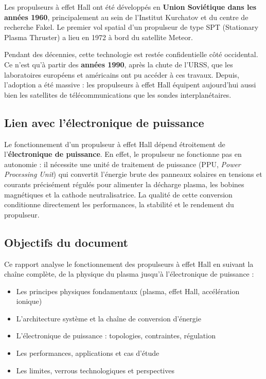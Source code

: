 \documentclass[12pt,a4paper]{article}
\begin{document}
Les propulseurs à effet Hall ont été développés en \textbf{Union Soviétique dans les années 1960}, principalement au sein de l'Institut Kurchatov et du centre de recherche Fakel. Le premier vol spatial d'un propulseur de type SPT (Stationary Plasma Thruster) a lieu en 1972 à bord du satellite Meteor.

Pendant des décennies, cette technologie est restée confidentielle côté occidental. Ce n'est qu'à partir des \textbf{années 1990}, après la chute de l'URSS, que les laboratoires européens et américains ont pu accéder à ces travaux. Depuis, l'adoption a été massive : les propulseurs à effet Hall équipent aujourd'hui aussi bien les satellites de télécommunications que les sondes interplanétaires.

\subsection{Lien avec l'électronique de puissance}

Le fonctionnement d'un propulseur à effet Hall dépend étroitement de l'\textbf{électronique de puissance}. En effet, le propulseur ne fonctionne pas en autonomie : il nécessite une unité de traitement de puissance (PPU, \textit{Power Processing Unit}) qui convertit l'énergie brute des panneaux solaires en tensions et courants précisément régulés pour alimenter la décharge plasma, les bobines magnétiques et la cathode neutralisatrice. La qualité de cette conversion conditionne directement les performances, la stabilité et le rendement du propulseur.

\subsection{Objectifs du document}

Ce rapport analyse le fonctionnement des propulseurs à effet Hall en suivant la chaîne complète, de la physique du plasma jusqu'à l'électronique de puissance :
\begin{itemize}
    \item Les principes physiques fondamentaux (plasma, effet Hall, accélération ionique)
    \item L'architecture système et la chaîne de conversion d'énergie
    \item L'électronique de puissance : topologies, contraintes, régulation
    \item Les performances, applications et cas d'étude
    \item Les limites, verrous technologiques et perspectives
\end{itemize}
\end{document}
